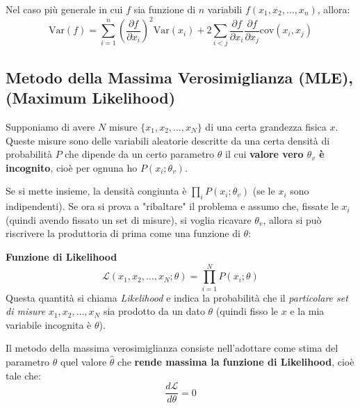 \documentclass[openany,a4paper,12pt]{book}
\providecommand{\mathscr}[1]{\mathcal{#1}}
\theoremstyle{remark}
\begin{document}
Nel caso più generale in cui $f$ sia funzione di $n$ variabili $f(x_1, x_2, \dots, x_n)$, allora:
\begin{equation}
\text{Var}(f) = \sum_{i=1}^n \left( \frac{\partial f}{\partial x_i} \right)^2 \text{Var}(x_i) + 2 \sum_{i < j} \frac{\partial f}{\partial x_i} \frac{\partial f}{\partial x_j} \text{cov}(x_i, x_j)
\end{equation}






\subsection{Metodo della Massima Verosimiglianza (MLE), (Maximum Likelihood)}

Supponiamo di avere $N$ misure $\{x_1, x_2, \dots, x_N\}$ di una certa grandezza fisica $x$. Queste misure sono delle variabili aleatorie descritte da una certa densità di probabilità $P$ che dipende da un certo parametro $\theta$ il cui \textbf{valore vero $\theta_v$ è incognito}, cioè per ognuna ho $P(x_i ; \theta_v)$.

Se si mette insieme, la densità congiunta è $\prod_i P(x_i ; \theta_v)$ (se le $x_i$ sono indipendenti). 
Se ora si prova a "ribaltare" il problema e assumo che, fissate le $x_i$ (quindi avendo fissato un set di misure), si voglia ricavare $\theta_v$, allora si può  riscrivere la produttoria di prima come una funzione di $\theta$:

\begin{definizione}\textbf{Funzione di Likelihood}
\begin{equation}
\mathscr{L}(x_1, x_2, \dots, x_N ; \theta) = \prod_{i=1}^N P(x_i ; \theta)
\end{equation}
Questa quantità si chiama \emph{Likelihood} e indica la probabilità che il \emph{particolare set di misure} $x_1, x_2, \dots, x_N$ sia prodotto da un dato $\theta$ (quindi fisso le $x$ e la mia variabile incognita è $\theta$).
\end{definizione}

Il metodo della massima verosimiglianza consiste nell'adottare come stima del parametro $\theta$ quel valore $\hat{\theta}$ che \textbf{rende massima la funzione di Likelihood}, cioè tale che:
\begin{equation}
\frac{d\mathscr{L}}{d\theta} = 0
\end{equation}
\end{document}
